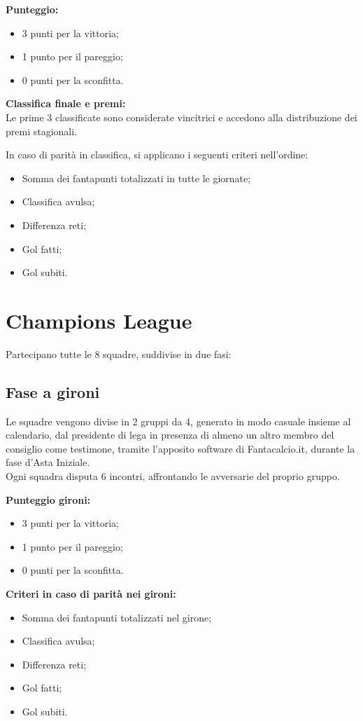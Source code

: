 \textbf{Punteggio:}
\begin{itemize}
\item 3 punti per la vittoria;
\item 1 punto per il pareggio;
\item 0 punti per la sconfitta.
\end{itemize}

\textbf{Classifica finale e premi:}\\
Le prime 3 classificate sono considerate vincitrici e accedono alla distribuzione dei premi stagionali.

In caso di parità in classifica, si applicano i seguenti criteri nell'ordine:
\begin{itemize}
\item Somma dei fantapunti totalizzati in tutte le giornate;
\item Classifica avulsa;
\item Differenza reti;
\item Gol fatti;
\item Gol subiti.
\end{itemize}

\section{Champions League}
\label{art:9.2}
Partecipano tutte le 8 squadre, suddivise in due fasi:

\subsection{Fase a gironi}
\label{art:9.2.1}

Le squadre vengono divise in 2 gruppi da 4, generato in modo casuale insieme al calendario, dal presidente di lega in presenza di almeno un altro membro del consiglio come testimone, tramite l'apposito software di Fantacalcio.it, durante la fase d'Asta Iniziale.\\
Ogni squadra disputa 6 incontri, affrontando le avversarie del proprio gruppo.

\textbf{Punteggio gironi:}
\begin{itemize}
\item 3 punti per la vittoria;
\item 1 punto per il pareggio;
\item 0 punti per la sconfitta.
\end{itemize}

\textbf{Criteri in caso di parità nei gironi:}
\begin{itemize}
\item Somma dei fantapunti totalizzati nel girone;
\item Classifica avulsa;
\item Differenza reti;
\item Gol fatti;
\item Gol subiti.
\end{itemize}

